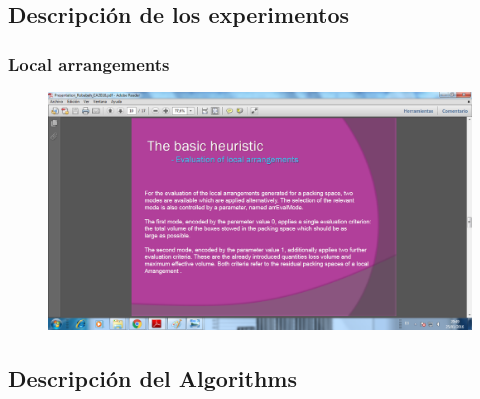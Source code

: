 \documentclass{beamer}
\begin{document}
\subsection{Descripción de los experimentos}
\begin{frame}
\frametitle{Local arrangements }
\begin{figure}[!th]
\begin{center}
\includegraphics[width=1\textwidth]{img/picn9.eps}
\end{center}
\end{figure}
\end{frame}

\subsection{Descripción del Algorithms }
\end{document}
